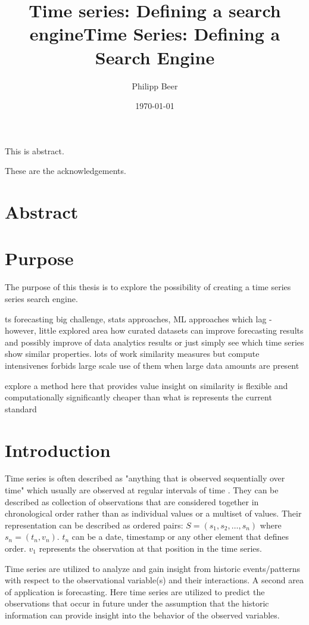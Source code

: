 \documentclass[phd,black, hidelinks]{PrincetonThesis}
\title{Time series: Defining a search engine}
\author{Philipp Beer}
\date{\today}
\title{Time Series: Defining a Search Engine}
\begin{document}
\pgfplotsset{compat=1.17}
\begin{frontmatter}
\begin{thesisabstract}
This is abstract.
\end{thesisabstract}
\begin{acknowledgements}
These are the acknowledgements.
\end{acknowledgements}
\end{frontmatter}
\cleardoublepage
\chapter{Abstract}
\label{sec:orgf3abe26}
\chapter{Purpose}
\label{sec:org9f7d761}
The purpose of this thesis is to explore the possibility of creating a time series series search engine.

ts forecasting big challenge, stats approaches, ML approaches which lag - however, little explored area how curated datasets can improve forecasting results and possibly improve of data analytics results or just simply see which time series show similar properties. lots of work similarity measures but compute intensivenes forbids large scale use of them when large data amounts are present

explore a method here that provides value insight on similarity is flexible and computationally significantly cheaper than what is represents the current standard

\chapter{Introduction}
\label{sec:org6adfd4d}
Time series is often described as "anything that is observed sequentially over time" which usually are observed at regular intervals of time \cite{hyndman2014forecasting}. They can be described as collection of observations that are considered together in chronological order rather than as individual values or a multiset of values. Their representation can be described as ordered pairs:
\(S = (s_1,s_2,\dots,s_n)\) where \(s_n = (t_n,v_n)\). \(t_n\) can be a date, timestamp or any other element that defines order. \(v_1\) represents the observation at that position in the time series.

Time series are utilized to analyze and gain insight from historic events/patterns with respect to the observational variable(s) and their interactions. A second area of application is forecasting. Here time series are utilized to predict the observations that occur in future under the assumption that the historic information can provide insight into the behavior of the observed variables.
\end{document}
